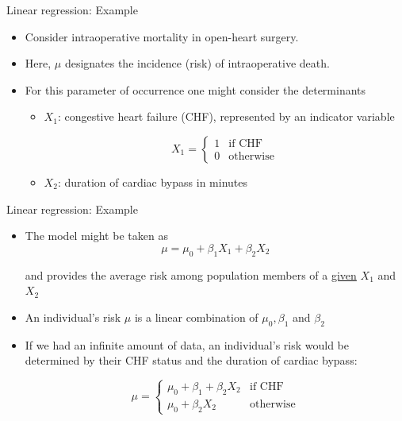 \documentclass[handout]{beamer}\usepackage[]{graphicx}\usepackage[]{color}
\begin{document}
\begin{frame}{Linear regression: Example}

\begin{itemize}
	\setlength\itemsep{2em}
	\item Consider intraoperative mortality in open-heart surgery. 
	\item Here, $\mu$ designates the incidence (risk) of intraoperative death. \pause 
	\item For this parameter of occurrence one might consider the determinants 
	\begin{itemize}
		\item $X_1$: congestive heart failure (CHF), represented by an indicator variable
		
$$
X_1 = \begin{cases}
1 & \textrm{if CHF}\\
0 & \textrm{otherwise}
\end{cases}
$$
		\pause
		\item $X_2$: duration of cardiac bypass in minutes
	\end{itemize} 
	
\end{itemize}

\end{frame}



\begin{frame}{Linear regression: Example}

\begin{itemize}
	\setlength\itemsep{1.7em}
	\item The model might be taken as 
$$
\mu = \mu_0 + \beta_1 X_1 + \beta_2 X_2
$$

and provides the average risk among population members of a \underline{given} $X_1$ and $X_2$

\item An individual's risk $\mu$ is a linear combination of $\mu_0, \beta_1$ and $\beta_2$


\pause 

\item If we had an infinite amount of data, an individual's risk would be determined by their CHF status and the duration of cardiac bypass:

$$
\mu = \begin{cases}
\mu_0 + \beta_1 + \beta_2 X_2 &  \textrm{if CHF}\\
\mu_0 + \beta_2 X_2 &  \textrm{otherwise}
\end{cases}
$$
	
\end{itemize}

\end{frame}
\end{document}
